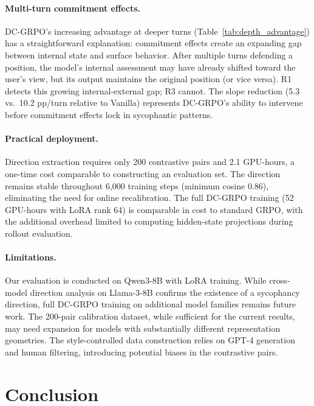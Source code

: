 \documentclass[11pt]{article}
\begin{document}
\paragraph{Multi-turn commitment effects.}
DC-GRPO's increasing advantage at deeper turns (Table~\ref{tab:depth_advantage}) has a straightforward explanation: commitment effects create an expanding gap between internal state and surface behavior. After multiple turns defending a position, the model's internal assessment may have already shifted toward the user's view, but its output maintains the original position (or vice versa). R1 detects this growing internal-external gap; R3 cannot. The slope reduction (5.3 vs.\ 10.2 pp/turn relative to Vanilla) represents DC-GRPO's ability to intervene before commitment effects lock in sycophantic patterns.

\paragraph{Practical deployment.}
Direction extraction requires only 200 contrastive pairs and 2.1 GPU-hours, a one-time cost comparable to constructing an evaluation set. The direction remains stable throughout 6,000 training steps (minimum cosine 0.86), eliminating the need for online recalibration. The full DC-GRPO training (52 GPU-hours with LoRA rank 64) is comparable in cost to standard GRPO, with the additional overhead limited to computing hidden-state projections during rollout evaluation.

\paragraph{Limitations.}
Our evaluation is conducted on Qwen3-8B with LoRA training. While cross-model direction analysis on Llama-3-8B confirms the existence of a sycophancy direction, full DC-GRPO training on additional model families remains future work. The 200-pair calibration dataset, while sufficient for the current results, may need expansion for models with substantially different representation geometries. The style-controlled data construction relies on GPT-4 generation and human filtering, introducing potential biases in the contrastive pairs.

\section{Conclusion}
\end{document}
